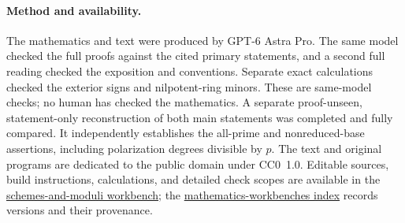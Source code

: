 \documentclass[11pt]{article}
\theoremstyle{definition}\newtheorem{definition}[theorem]{Definition}
\theoremstyle{remark}\newtheorem{remark}[theorem]{Remark}
\newcommand{\workbenchurl}{https://github.com/KokunoYumeto/schemes-and-moduli-workbench}
\newcommand{\recordurl}{https://github.com/KokunoYumeto/mathematics-workbenches}
\begin{document}
\paragraph{Method and availability.}
The mathematics and text were produced by GPT-6 Astra Pro. The same model checked the full proofs against the cited primary statements, and a second full reading checked the exposition and conventions. Separate exact calculations checked the exterior signs and nilpotent-ring minors. These are same-model checks; no human has checked the mathematics. A separate proof-unseen, statement-only reconstruction of both main statements was completed and fully compared. It independently establishes the all-prime and nonreduced-base assertions, including polarization degrees divisible by $p$. The text and original programs are dedicated to the public domain under CC0~1.0. Editable sources, build instructions, calculations, and detailed check scopes are available in the \href{\workbenchurl}{schemes-and-moduli workbench}; the \href{\recordurl}{mathematics-workbenches index} records versions and their provenance.
\end{document}
